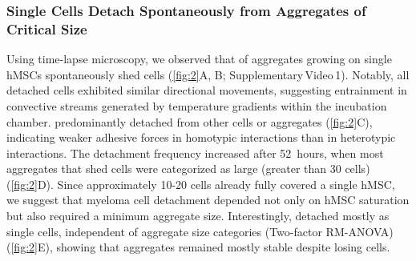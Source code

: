 
\subsubsection*{Single \INA Cells Detach Spontaneously from Aggregates of Critical Size}
Using time-lapse microscopy, we observed that  of
\INA aggregates growing on single hMSCs spontaneously shed \INA cells
(\autoref{fig:2}A, B; Supplementary\,Video\,1). Notably, all detached cells
exhibited similar directional movements, suggesting entrainment in convective
streams generated by temperature gradients within the incubation chamber. \INA
predominantly detached from other \INA cells or aggregates (\autoref{fig:2}C),
indicating weaker adhesive forces in homotypic interactions than in heterotypic
interactions. The detachment frequency increased after \SI{52}{hours}, when most
aggregates that shed \INA cells were categorized as large (greater than 30
cells) (\autoref{fig:2}D). Since approximately 10-20 \INA cells already fully
covered a single hMSC, we suggest that myeloma cell detachment depended not only
on hMSC saturation but also required a minimum aggregate size. Interestingly,
\INA detached mostly as single cells, independent of aggregate size categories
(Two-factor RM-ANOVA) (\autoref{fig:2}E),
showing that aggregates remained mostly stable despite losing cells.





